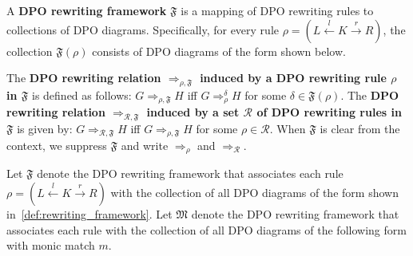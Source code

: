     \begin{definition}
  \label{def:rewriting_framework}
    A \textbf{DPO rewriting framework} $\mathfrak{F}$ is a mapping of DPO rewriting rules to collections of DPO diagrams. Specifically, for every rule \( \rho = (L \overset{l}{\leftarrow} K \overset{r}{\rightarrow} R) \), the collection $\mathfrak{F}(\rho)$ consists of DPO diagrams of the form shown below.
 \begin{center}
    \end{center}
    The \textbf{DPO rewriting relation $\Rightarrow_{\rho,\mathfrak{F}}$ induced by a DPO rewriting rule $\rho$ in $\mathfrak{F}$} is defined as follows: $G \Rightarrow_{\rho,\mathfrak{F}} H$ iff $G \Rightarrow_\rho^\delta H$ for some $\delta \in \mathfrak{F}(\rho)$. 
     The \textbf{DPO rewriting relation $\Rightarrow_{\mathcal{R},\mathfrak{F}}$ induced by a set $\mathcal{R}$ of DPO rewriting rules in $\mathfrak{F}$} is given by: $G \Rightarrow_{\mathcal{R},\mathfrak{F}} H$ iff $G \Rightarrow_{\rho,\mathfrak{F}} H$ for some $\rho \in \mathcal{R}$. When $\mathfrak{F}$ is clear from the context, we 
    suppress $\mathfrak{F}$ and 
    write $\Rightarrow_{\rho}$ and $\Rightarrow_{\mathcal{R}}$.
  \end{definition}
Let \(\mathfrak{F}\) denote the DPO rewriting framework that associates each rule \( \rho = (L \overset{l}{\leftarrow} K \overset{r}{\rightarrow} R) \) with the collection of all DPO diagrams of the form shown in~\autoref{def:rewriting_framework}.
Let \(\mathfrak{M}\) denote the DPO rewriting framework that associates each rule with the collection of all DPO diagrams of the following form with monic match $m$.  

